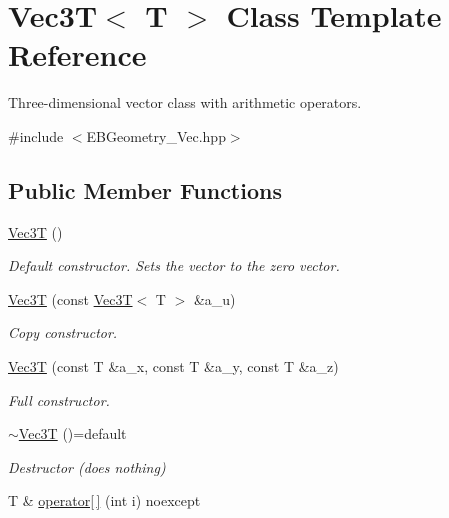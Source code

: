 \hypertarget{classVec3T}{}\section{Vec3T$<$ T $>$ Class Template Reference}
\label{classVec3T}


Three-\/dimensional vector class with arithmetic operators.  




{\ttfamily \#include $<$E\+B\+Geometry\+\_\+\+Vec.\+hpp$>$}

\subsection*{Public Member Functions}
\begin{DoxyCompactItemize}
\item 
\mbox{\label{classVec3T_a919b1cabc678f8d71763e03fab500334}} 
\hyperlink{classVec3T_a919b1cabc678f8d71763e03fab500334}{Vec3T} ()
\begin{DoxyCompactList}\small\item\em Default constructor. Sets the vector to the zero vector. \end{DoxyCompactList}\item 
\hyperlink{classVec3T_ab328767434f527b25c110dc83a0cb7ee}{Vec3T} (const \hyperlink{classVec3T}{Vec3T}$<$ T $>$ \&a\+\_\+u)
\begin{DoxyCompactList}\small\item\em Copy constructor. \end{DoxyCompactList}\item 
\hyperlink{classVec3T_acc3573bc8c3232eb14a22ca833cbce30}{Vec3T} (const T \&a\+\_\+x, const T \&a\+\_\+y, const T \&a\+\_\+z)
\begin{DoxyCompactList}\small\item\em Full constructor. \end{DoxyCompactList}\item 
\mbox{\label{classVec3T_a505fc5de8e213d1fc8e0df5f3b7a3dc7}} 
\hyperlink{classVec3T_a505fc5de8e213d1fc8e0df5f3b7a3dc7}{$\sim$\+Vec3T} ()=default
\begin{DoxyCompactList}\small\item\em Destructor (does nothing) \end{DoxyCompactList}\item 
T \& \hyperlink{classVec3T_a098a19968b6c7b0b76c2572e5236a71a}{operator\mbox{[}$\,$\mbox{]}} (int i) noexcept

\end{DoxyCompactItemize}
